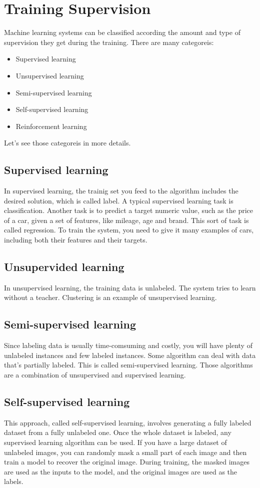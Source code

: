 \section{Training Supervision}
Machine learning systems can be classified according the amount and type of supervision they get during the training. 
There are many categoreis:
\begin{itemize}
    \item Supervised learning
    \item Unsupervised learning
    \item Semi-supervised learning
    \item Self-supervised learning
    \item Reinforcement learning
\end{itemize}

Let's see those categoreis in more details. 

\subsection{Supervised learning}
In supervised learning, the trainig set you feed to the algorithm includes the desired solution, which is called label. A typical supervised learning task is classification. 
Another task is to predict a target numeric value, such as the price of a car, given a set of features, like mileage, age and brand. This sort of task is called regression. 
To train the system, you need to give it many examples of cars, including both their features and their targets.

\subsection{Unsupervided learning}
In unsupervised learning, the training data is unlabeled. The system tries to learn without a teacher. Clustering is an example of unsupervised learning.

\subsection{Semi-supervised learning}
Since labeling data is usually time-comsuming and costly, you will have plenty of unlabeled instances and few labeled instances. Some algorithm can deal with data that's partially labeled. 
This is called semi-supervised learning. Those algorithms are a combination of unsupervised and supervised learning.

\subsection{Self-supervised learning}
This approach, called self-supervised learning, involves generating a fully labeled dataset from a fully unlabeled one. Once the whole dataset is labeled, any supervised learning algorithm can be used.
If you have a large dataset of unlabeled images, you can randomly mask a small part of each image and then train a model to recover the original image. 
During training, the masked images are used as the inputs to the model, and the original images are used as the labels. 

